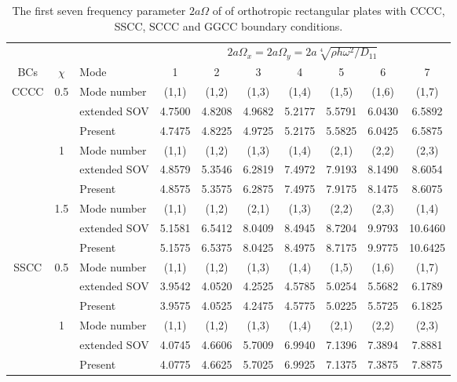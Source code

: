 \documentclass[preprint,12pt]{elsarticle}
\begin{document}
\begin{table}[!htbp] 
	\centering
	\caption{The first seven frequency parameter $2a\Omega$ of of orthotropic rectangular plates with CCCC, SSCC, SCCC and GGCC boundary conditions.}
	\begin{tabular}{c c l c c c c c c c}
		\toprule
		\multicolumn{3}{c}{} & \multicolumn{7}{c}{$2a\Omega_x=2a\Omega_y=2a\sqrt[4]{\rho h \omega^2/D_{11}}$} \\ 
		\cmidrule(lr){4-10}
		BCs & $\chi$ & Mode & 1 & 2 & 3 & 4 & 5 & 6 & 7 \\
		\midrule
		CCCC & 0.5 & Mode number  & (1,1) & (1,2) & (1,3) & (1,4) & (1,5) & (1,6) & (1,7) \\
		&     & extended SOV \Citealp{xing2020extended}   & 4.7500 & 4.8208 & 4.9682 & 5.2177 & 5.5791 & 6.0430 & 6.5892 \\
		&     & Present       & 4.7475 & 4.8225 & 4.9725 & 5.2175 & 5.5825 & 6.0425 & 6.5875 \\
		& 1   & Mode number   & (1,1) & (1,2) & (1,3) & (1,4) & (2,1) & (2,2) & (2,3) \\
		&     & extended SOV \Citealp{xing2020extended}   & 4.8579 & 5.3546 & 6.2819 & 7.4972 & 7.9193 & 8.1490 & 8.6054 \\
		&     & Present       & 4.8575 & 5.3575 & 6.2875 & 7.4975 & 7.9175 & 8.1475 & 8.6075 \\
		& 1.5 & Mode number   & (1,1) & (1,2) & (2,1) & (1,3) & (2,2) & (2,3) & (1,4) \\
		&     & extended SOV \Citealp{xing2020extended}   & 5.1581 & 6.5412 & 8.0409 & 8.4945 & 8.7204 & 9.9793 & 10.6460 \\
		&     & Present       & 5.1575 & 6.5375 & 8.0425 & 8.4975 & 8.7175 & 9.9775 & 10.6425 \\
		SSCC & 0.5 & Mode number   & (1,1) & (1,2) & (1,3) & (1,4) & (1,5) & (1,6) & (1,7) \\
		&     & extended SOV \Citealp{xing2020extended}   & 3.9542 & 4.0520 & 4.2525 & 4.5785 & 5.0254 & 5.5682 & 6.1789 \\
		&     & Present       & 3.9575 & 4.0525 & 4.2475 & 4.5775 & 5.0225 & 5.5725 & 6.1825 \\
		& 1   & Mode number  & (1,1) & (1,2) & (1,3) & (1,4) & (2,1) & (2,2) & (2,3) \\
		&     & extended SOV \Citealp{xing2020extended}   & 4.0745 & 4.6606 & 5.7009 & 6.9940 & 7.1396 & 7.3894 & 7.8881 \\
		&     & Present       & 4.0775 & 4.6625 & 5.7025 & 6.9925 & 7.1375 & 7.3875 & 7.8875 \\

\end{tabular}
\end{table}
\end{document}
